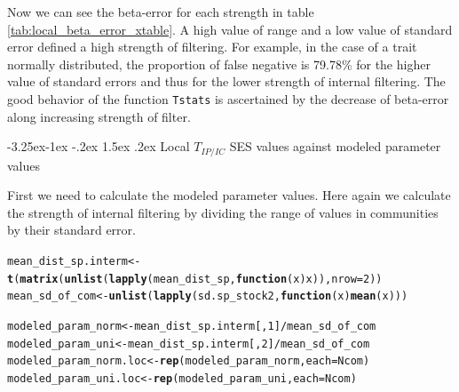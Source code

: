 \documentclass[12pt]{article}\usepackage[]{graphicx}\usepackage[]{color}
\makeatletter
\newcommand{\hlnum}[1]{\textcolor[rgb]{0.686,0.059,0.569}{#1}}%
\newcommand{\hlopt}[1]{\textcolor[rgb]{0,0,0}{#1}}%
\newcommand{\hlstd}[1]{\textcolor[rgb]{0.345,0.345,0.345}{#1}}%
\newcommand{\hlkwa}[1]{\textcolor[rgb]{0.161,0.373,0.58}{\textbf{#1}}}%
\newcommand{\hlkwb}[1]{\textcolor[rgb]{0.69,0.353,0.396}{#1}}%
\newcommand{\hlkwc}[1]{\textcolor[rgb]{0.333,0.667,0.333}{#1}}%
\newcommand{\hlkwd}[1]{\textcolor[rgb]{0.737,0.353,0.396}{\textbf{#1}}}%
\newenvironment{kframe}{%
 \def\at@end@of@kframe{}%
 \ifinner\ifhmode%
  \def\at@end@of@kframe{\end{minipage}}%
  \begin{minipage}{\columnwidth}%
 \fi\fi%
 \def\FrameCommand##1{\hskip\@totalleftmargin \hskip-\fboxsep
 \colorbox{shadecolor}{##1}\hskip-\fboxsep
     \hskip-\linewidth \hskip-\@totalleftmargin \hskip\columnwidth}%
 \MakeFramed {\advance\hsize-\width
   \@totalleftmargin\z@ \linewidth\hsize
   \@setminipage}}%
 {\par\unskip\endMakeFramed%
 \at@end@of@kframe}
\newenvironment{knitrout}{}{} %
\newcounter {subsubsubsection}[subsubsection]
\newcommand\subsubsubsection{\@startsection{subsubsubsection}{4}{\z@}%
          {-3.25ex\@plus -1ex \@minus -.2ex}%
          {1.5ex \@plus .2ex}%
          {\normalfont\normalsize\bfseries}}
\makeatother
\begin{document}
 

Now we can see the beta-error for each strength in table \ref{tab:local_beta_error_xtable}. A high value of range and a low value of standard error defined a high strength of filtering. For example, in the case of a trait normally distributed, the proportion of false negative is 79.78\% for the higher value of standard errors and thus for the lower strength of internal filtering. The good behavior of the function \texttt{Tstats} is ascertained by the decrease of beta-error along increasing strength of filter.
 
 
  \subsubsubsection {Local $T_{IP/IC}$ SES values against modeled parameter values}
  
  First we need to calculate the modeled parameter values. Here again we calculate the strength of internal filtering by dividing the range of values in communities by their standard error.
  
\begin{knitrout}\small
{}\color{fgcolor}\begin{kframe}
\begin{alltt}
\hlstd{mean_dist_sp.interm} \hlkwb{<-} \hlkwd{t}\hlstd{(}\hlkwd{matrix}\hlstd{(}\hlkwd{unlist}\hlstd{(}\hlkwd{lapply}\hlstd{(mean_dist_sp,} \hlkwa{function}\hlstd{(}\hlkwc{x}\hlstd{) x)),} \hlkwc{nrow} \hlstd{=} \hlnum{2}\hlstd{))}
\hlstd{mean_sd_of_com} \hlkwb{<-} \hlkwd{unlist}\hlstd{(}\hlkwd{lapply}\hlstd{(sd.sp_stock2,} \hlkwa{function}\hlstd{(}\hlkwc{x}\hlstd{)} \hlkwd{mean}\hlstd{(x)))}

\hlstd{modeled_param_norm} \hlkwb{<-} \hlstd{mean_dist_sp.interm[,} \hlnum{1}\hlstd{]} \hlopt{/} \hlstd{mean_sd_of_com}
\hlstd{modeled_param_uni} \hlkwb{<-} \hlstd{mean_dist_sp.interm[,} \hlnum{2}\hlstd{]} \hlopt{/} \hlstd{mean_sd_of_com}
\hlstd{modeled_param_norm.loc} \hlkwb{<-} \hlkwd{rep}\hlstd{(modeled_param_norm,} \hlkwc{each} \hlstd{= Ncom)}
\hlstd{modeled_param_uni.loc} \hlkwb{<-} \hlkwd{rep}\hlstd{(modeled_param_uni,} \hlkwc{each} \hlstd{= Ncom)}
\end{alltt}
\end{kframe}
\end{knitrout}
\end{document}
